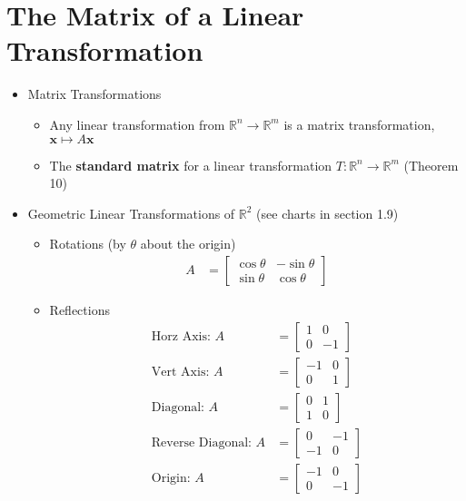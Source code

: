 \documentclass[10pt]{book}
\newcommand{\R}{\mathbb{R}}
\newcommand{\vect}[1]{\ensuremath{\boldsymbol{\mathbf{#1}}}}
\newcommand{\RotMat}[1][\theta]{\begin{bmatrix}\cos#1&-\sin#1\\ \sin#1&\cos#1\end{bmatrix}}
\newcommand{\ReflectMatHorz}{\begin{bmatrix}1&0\\0&-1\end{bmatrix}}
\newcommand{\ReflectMatVert}{\begin{bmatrix}-1&0\\0&1\end{bmatrix}}
\newcommand{\ReflectMatDiag}{\begin{bmatrix}0&1\\1&0\end{bmatrix}}
\newcommand{\ReflectMatRevDiag}{\begin{bmatrix}0&-1\\-1&0\end{bmatrix}}
\newcommand{\ReflectMatOrigin}{\begin{bmatrix}-1&0\\0&-1\end{bmatrix}}
\begin{document}
\section{The Matrix of a Linear Transformation}
\begin{itemize}
	\item Matrix Transformations
		\begin{itemize}
			\item Any linear transformation from $\R^n\to\R^m$ is a matrix transformation, $\vect{x}\mapsto A\vect{x}$
			\item The \textbf{standard matrix} for a linear transformation $T:\R^n\to\R^m$ (Theorem 10)
		\end{itemize}
	\item Geometric Linear Transformations of $\R^2$ (see charts in section 1.9)
		\begin{multicols}{2}
		\begin{itemize}
			\item Rotations (by $\theta$ about the origin)
				\begin{align*}
				A&=\RotMat
				\end{align*}
			\item Reflections
				\begin{align*}
				\text{Horz Axis: } A&=\ReflectMatHorz \\
				\text{Vert Axis: } A&=\ReflectMatVert \\
				\text{Diagonal: } A&=\ReflectMatDiag \\
				\text{Reverse Diagonal: } A&=\ReflectMatRevDiag \\
				\text{Origin: } A&=\ReflectMatOrigin
				\end{align*}
				
			\columnbreak
			

\end{itemize}
\end{multicols}
\end{itemize}
\end{document}
